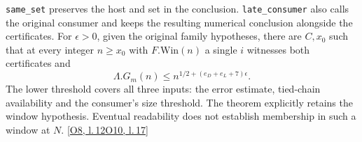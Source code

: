 \documentclass[12pt,letterpaper]{article}
\newcommand{\id}[1]{{\small\nolinkurl{#1}}}
\begin{document}
\id{same_set} preserves the host and set in the conclusion. \id{late_consumer} also calls the original consumer and keeps the resulting numerical conclusion alongside the certificates. For $\epsilon>0$, given the original family hypotheses, there are $C,x_0$ such that at every integer $n\geq x_0$ with $F.\mathrm{Win}(n)$ a single $i$ witnesses both certificates and
\[
        \Lambda.G_m(n)\le n^{1/2+(e_D+e_L+7)\epsilon}.
\]
The lower threshold covers all three inputs: the error estimate, tied-chain availability and the consumer's size threshold. The theorem explicitly retains the window hypothesis. Eventual readability does not establish membership in such a window at $N$. {\footnotesize\sffamily\color{mute}[\href{https://github.com/nousentllc/riemann-hypothesis/blob/40e56bab026552e089d7afcfeff08d2defb9c005/src/Development/AutomorphicArithmetic/PrimitiveCosets/CoreGm.lean\#L12}{O8, l.\,12}\enspace \href{https://github.com/nousentllc/riemann-hypothesis/blob/40e56bab026552e089d7afcfeff08d2defb9c005/src/Development/AutomorphicArithmetic/PrimitiveCosets/WindowInequalityOfArtinInputs.lean\#L17}{O10, l.\,17}]}
\end{document}
